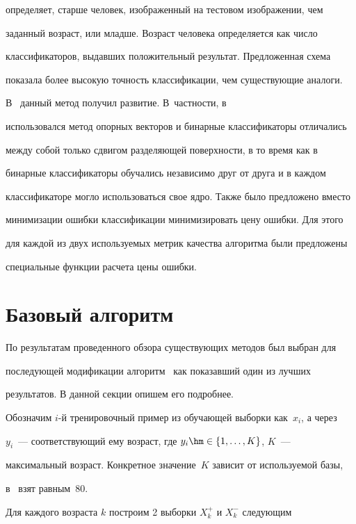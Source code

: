 определяет, старше человек, изображенный на тестовом изображении, чем

заданный возраст, или младше. Возраст человека определяется как число

классификаторов, выдавших положительный результат. Предложенная схема

показала более высокую точность классификации, чем существующие аналоги.



В~\cite{5-r} данный метод получил развитие. В~частности, в~\cite{4-r}

использовался метод опорных векторов и бинарные классификаторы отличались

между собой только сдвигом разделяющей поверхности, в то время как в~\cite{5-r}

бинарные классификаторы обучались независимо друг от друга и в каждом

классификаторе могло использоваться свое ядро. Также было предложено вместо

минимизации ошибки классификации минимизировать цену ошибки. Для этого

для каждой из двух используемых метрик качества алгоритма были предложены

специальные функции расчета цены ошибки.





\section{Базовый алгоритм}



По результатам проведенного обзора существующих методов был выбран для

последующей модификации алгоритм~\cite{5-r} как показавший один из лучших

результатов. В данной секции опишем его подробнее.



Обозначим $i$-й тренировочный пример из обучающей выборки как~$x_i$, а через

$y_i$~--- соответствующий ему возраст, где $y_i\hm\in \{1, \ldots, K\}$, $K$~---

максимальный возраст. Конкретное значение~$K$ зависит от используемой базы,

в~\cite{5-r} взят равным~80.



Для каждого возраста $k$ построим 2 выборки $X_k^+$ и $X_k^-$ следующим

